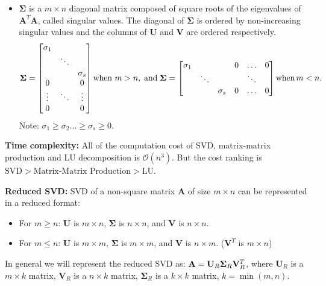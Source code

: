 \documentclass[12pt]{article}
\begin{document}
\begin{itemize}
    
    \item $\mathbf{\Sigma}$ is a $m \times n$ diagonal matrix composed of square roots of the eigenvalues of $\mathbf{A}^T\mathbf{A}$, called singular values. The diagonal of $\mathbf{\Sigma}$ is ordered by non-increasing singular values and the columns of $\mathbf{U}$ and $\mathbf{V}$ are ordered respectively.
    \begin{eqnarray*} {\bf \Sigma} = \begin{bmatrix} \sigma_1 & & \\ & \ddots & \\ & & \sigma_s \\ 0 & & 0 \\ \vdots & \ddots & \vdots \\ 0 & & 0 \end{bmatrix} \text{when } m > n, \; \text{and} \; {\bf \Sigma} = \begin{bmatrix} \sigma_1 & & & 0 & \dots & 0 \\ & \ddots & & & \ddots &\\ & & \sigma_s & 0 & \dots & 0 \\ \end{bmatrix} \text{when} \, m < n. \end{eqnarray*}
    Note: $\sigma_1 \ge \sigma_2 \dots \ge \sigma_s \ge 0$.
\end{itemize}

\medskip
\noindent \textbf{Time complexity:} All of the computation cost of SVD, matrix-matrix production and LU decomposition is $\mathcal{O}(n^3)$. But the cost ranking is $\text{SVD} > \text{Matrix-Matrix Production} > \text{LU}$. 

\medskip
\noindent \textbf{Reduced SVD:} SVD of a non-square matrix $\mathbf{A}$ of size $m \times n$ can be represented in a reduced format:
    \begin{itemize}
        \item For $m \ge n$: $\mathbf{U}$ is $m \times n$, $\mathbf{\Sigma}$ is $n \times n$, and $\mathbf{V}$ is $n \times n$.
        \item For $m \le n$: $\mathbf{U}$ is $m \times m$, $\mathbf{\Sigma}$ is $m \times m$, and $\mathbf{V}$ is $n \times m$. ($\mathbf{V}^T$ is $m \times n$)
    \end{itemize}

    In general we will represent the reduced SVD as: ${\bf A} = {\bf U}_R {\bf \Sigma}_R {\bf V}_R^T$, where $\mathbf{U}_R$ is a $m \times k$ matrix, $\mathbf{V}_R$ is a $n \times k$ matrix, $\mathbf{\Sigma}_R$ is a $k \times k$ matrix, $k = \min(m, n)$.
\end{document}
